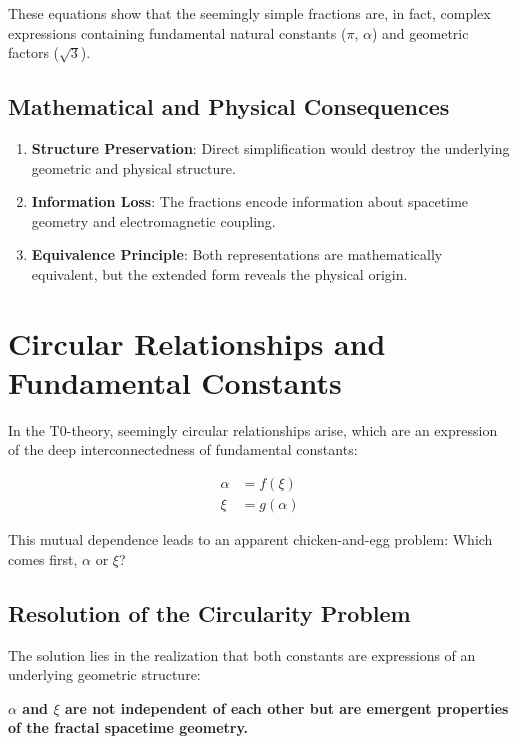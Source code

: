 \documentclass[12pt,a4paper]{article}
\begin{document}
	These equations show that the seemingly simple fractions are, in fact, complex expressions containing fundamental natural constants (\(\pi\), \(\alpha\)) and geometric factors (\(\sqrt{3}\)).
	
	\subsection*{Mathematical and Physical Consequences}
	
	\begin{enumerate}
		\item \textbf{Structure Preservation}: Direct simplification would destroy the underlying geometric and physical structure.
		
		\item \textbf{Information Loss}: The fractions encode information about spacetime geometry and electromagnetic coupling.
		
		\item \textbf{Equivalence Principle}: Both representations are mathematically equivalent, but the extended form reveals the physical origin.
	\end{enumerate}
	
	\section{Circular Relationships and Fundamental Constants}
	\label{sec:circular}
	
	In the T0-theory, seemingly circular relationships arise, which are an expression of the deep interconnectedness of fundamental constants:
	
	\begin{align*}
		\alpha &= f(\xi) \\
		\xi &= g(\alpha)
	\end{align*}
	
	This mutual dependence leads to an apparent chicken-and-egg problem: Which comes first, \(\alpha\) or \(\xi\)?
	
	\subsection{Resolution of the Circularity Problem}
	
	The solution lies in the realization that both constants are expressions of an underlying geometric structure:
	
	\begin{tcolorbox}[colback=green!5!white,colframe=green!75!black]
		\textbf{\(\alpha\) and \(\xi\) are not independent of each other but are emergent properties of the fractal spacetime geometry.}
	\end{tcolorbox}
	
\end{document}
